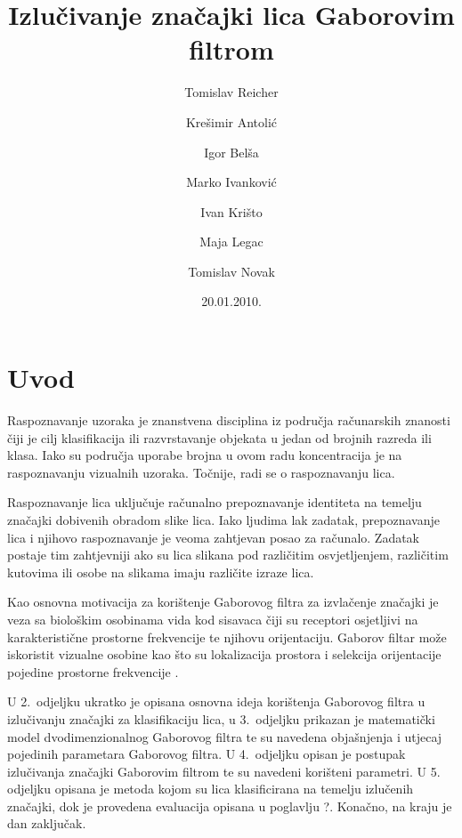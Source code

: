 \documentclass[12pt,a4paper]{ReportAA}
\begin{document}
\title{Izlučivanje značajki lica Gaborovim filtrom}
\author{Tomislav Reicher \and Krešimir Antolić \and Igor Belša \and Marko Ivanković \and Ivan Krišto \and Maja Legac \and Tomislav Novak}
\date{20.01.2010.}
\maketitle

\newpage

\tableofcontents

\chapter{Uvod}
Raspoznavanje uzoraka je znanstvena disciplina iz područja računarskih znanosti
čiji je cilj klasifikacija ili razvrstavanje objekata u jedan od brojnih razreda
ili klasa. Iako su područja uporabe brojna u ovom radu koncentracija je na
raspoznavanju vizualnih uzoraka. Točnije, radi se o raspoznavanju lica.

Raspoznavanje lica uključuje računalno prepoznavanje identiteta na temelju
značajki dobivenih obradom slike lica. Iako ljudima lak zadatak, prepoznavanje
lica i njihovo raspoznavanje je veoma zahtjevan posao za računalo. Zadatak
postaje tim zahtjevniji ako su lica slikana pod različitim osvjetljenjem,
različitim kutovima ili osobe na slikama imaju različite izraze lica.

Kao osnovna motivacija za korištenje Gaborovog filtra za izvlačenje značajki je
veza sa biološkim osobinama vida kod sisavaca čiji su receptori osjetljivi na
karakteristične prostorne frekvencije te njihovu orijentaciju. Gaborov filtar
može iskoristit vizualne osobine kao što su lokalizacija prostora i selekcija
orijentacije pojedine prostorne frekvencije
\citep{bhuiyan2007onfacerecognition}\nocite{daugman1985uncertainty}.

U 2.~odjeljku ukratko je opisana osnovna ideja korištenja Gaborovog
filtra u izlučivanju značajki za klasifikaciju lica, u 3.~odjeljku prikazan je
matematički model dvodimenzionalnog Gaborovog filtra te su navedena objašnjenja
i utjecaj pojedinih parametara Gaborovog filtra. U 4.~odjeljku opisan je
postupak izlučivanja značajki Gaborovim filtrom te su navedeni korišteni
parametri. U 5. odjeljku opisana je metoda kojom su lica klasificirana na temelju
izlučenih značajki, dok je provedena evaluacija opisana u poglavlju ?. Konačno, na
kraju je dan zaključak.
\end{document}
